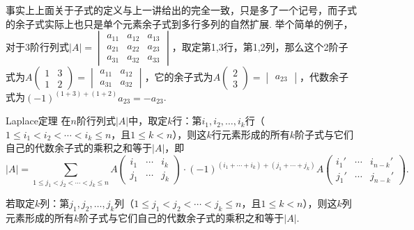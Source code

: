 事实上上面关于子式的定义与上一讲给出的完全一致，只是多了一个记号，而子式的余子式实际上也只是单个元素余子式到多行多列的自然扩展. 举个简单的例子，对于3阶行列式$|A|=\begin{vmatrix}
        a_{11} & a_{12} & a_{13} \\
        a_{21} & a_{22} & a_{23} \\
        a_{31} & a_{32} & a_{33}
    \end{vmatrix}$，取定第1,3行，第1,2列，那么这个2阶子式为$A\begin{pmatrix}
        1 & 3 \\
        1 & 2
    \end{pmatrix}=\begin{vmatrix}
        a_{11} & a_{12} \\
        a_{31} & a_{32}
    \end{vmatrix}$，它的余子式为$A\begin{pmatrix}
        2 \\ 3
    \end{pmatrix}=\begin{vmatrix}
        a_{23}
    \end{vmatrix}$，代数余子式为$(-1)^{(1+3)+(1+2)}a_{23}=-a_{23}$.

\begin{theorem}{}{Laplace定理}
    在$n$阶行列式$|A|$中，取定$k$行：第$i_1,i_2,\ldots,i_k$行（$1\leqslant i_1<i_2<\cdots<i_k\leqslant n$，且$1\leqslant k<n$），则这$k$行元素形成的所有$k$阶子式与它们自己的代数余子式的乘积之和等于$|A|$，即
    \begin{equation}\label{eq:14:Laplace定理}
        |A|=\sum_{1\leqslant j_1<j_2<\cdots<j_k\leqslant n}A\begin{pmatrix}
            i_1 & \cdots & i_k \\
            j_1 & \cdots & j_k
        \end{pmatrix}\cdot (-1)^{(i_1+\cdots+i_k)+(j_1+\cdots+j_k)}A\begin{pmatrix}
            i_1' & \cdots & i_{n-k}' \\
            j_1' & \cdots & j_{n-k}'
        \end{pmatrix}.
    \end{equation}

    若取定$k$列：第$j_1,j_2,\ldots,j_k$列（$1\leqslant j_1<j_2<\cdots<j_k\leqslant n$，且$1\leqslant k<n$），则这$k$列元素形成的所有$k$阶子式与它们自己的代数余子式的乘积之和等于$|A|$.
\end{theorem}

